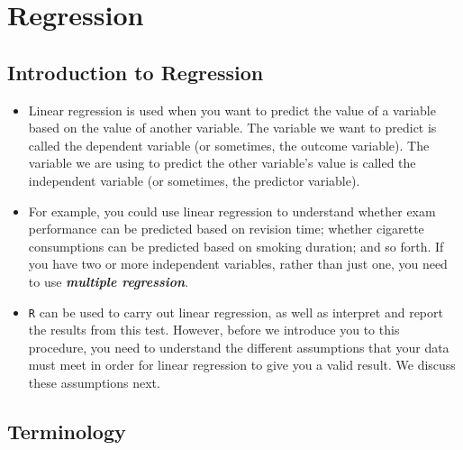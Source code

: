 \documentclass[]{report}
\begin{document}

\chapter{Regression}



			\section{Introduction to Regression}
			
			\begin{itemize}
				\item Linear regression is used when you want to predict the value of a variable based on the value of another variable. The variable we want to predict is called the dependent variable (or sometimes, the outcome variable). The variable we are using to predict the other variable's value is called the independent variable (or sometimes, the predictor variable).
				
				
				\item For example, you could use linear regression to understand whether exam performance can be predicted based on revision time; whether cigarette consumptions can be predicted based on smoking duration; and so forth. If you have two or more independent variables, rather than just one, you need to use \textbf{\textit{multiple regression}}.
				
				\item	\texttt{R} can be used to carry out linear regression, as well as interpret and report the results from this test. However, before we introduce you to this procedure, you need to understand the different assumptions that your data must meet in order for linear regression to give you a valid result. We discuss these assumptions next.
				
			\end{itemize}
			
			
			
			









	\section{Terminology}
	
\end{document}

